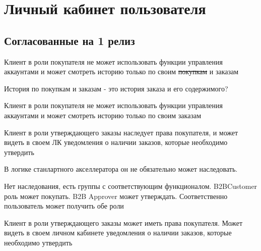\section{Личный кабинет пользователя}

\ifcand
\subsection{Согласованные на 1 релиз}
\fi
{}
{

\begin{wiki}
Клиент в роли покупателя не может использовать функции управления аккаунтами и может смотреть историю только по своим \sout{покупкам} и заказам
\end{wiki}

\begin{hybris}
История по покупкам и заказам - это история заказа и его содержимого?
\end{hybris}


\begin{itogo}
Клиент в роли покупателя не может использовать функции управления аккаунтами и может смотреть историю только по своим заказам
\end{itogo}
}
{


\begin{wiki}
Клиент в роли утверждающего заказы наследует права покупателя, и может видеть в своем ЛК уведомления о наличии заказов, которые необходимо утвердить
\end{wiki}

\begin{teamidea}
В логике станлартного акселлератора он не обязательно может наследовать.
\end{teamidea}

\begin{hybris}
Нет наследования, есть группы с соответствующим функционалом. B2BCustomer роль может покупать. B2B Approver может утверждать. Соответственно пользователь может получить обе роли
\end{hybris}


\begin{itogo}
Клиент в роли утверждающего заказы может иметь права покупателя. Может видеть в своем личном кабинете уведомления о наличии заказов, которые необходимо утвердить
\end{itogo}
}

